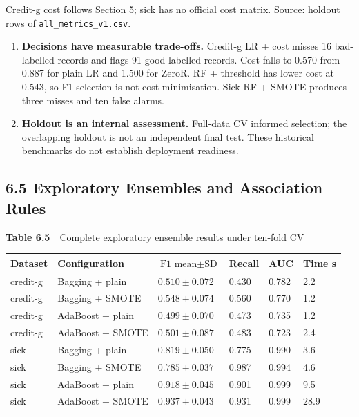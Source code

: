 \documentclass[12pt]{article}
\begin{document}
Credit-g cost follows Section 5; sick has no official cost matrix.
Source: holdout rows of \texttt{all\_metrics\_v1.csv}.

\begin{enumerate}
\item \textbf{Decisions have measurable trade-offs.} Credit-g LR + cost misses 16
bad-labelled records and flags 91 good-labelled records. Cost falls to 0.570 from
0.887 for plain LR and 1.500 for ZeroR. RF + threshold has lower cost at 0.543, so F1
selection is not cost minimisation. Sick RF + SMOTE produces three misses and ten
false alarms.
\item \textbf{Holdout is an internal assessment.} Full-data CV informed selection; the
overlapping holdout is not an independent final test. These historical benchmarks do
not establish deployment readiness.
\end{enumerate}

\subsection*{6.5 Exploratory Ensembles and Association Rules}

\begin{center}
\begin{minipage}{\textwidth}
\centering
{\footnotesize\textbf{Table 6.5}\ \ Complete exploratory ensemble results under ten-fold CV}

\footnotesize
\begin{tabular}{p{0.75in}p{1.3in}p{1.05in}p{0.65in}p{0.55in}p{0.55in}}
\toprule
Dataset & Configuration & $\text{F1 mean} \pm \text{SD}$ & Recall & AUC & Time s \\
\midrule
credit-g & Bagging + plain & $0.510 \pm 0.072$ & 0.430 & 0.782 & 2.2 \\
credit-g & Bagging + SMOTE & $\mathbf{0.548 \pm 0.074}$ & 0.560 & 0.770 & 1.2 \\
credit-g & AdaBoost + plain & $0.499 \pm 0.070$ & 0.473 & 0.735 & 1.2 \\
credit-g & AdaBoost + SMOTE & $0.501 \pm 0.087$ & 0.483 & 0.723 & 2.4 \\
sick & Bagging + plain & $0.819 \pm 0.050$ & 0.775 & 0.990 & 3.6 \\
sick & Bagging + SMOTE & $0.785 \pm 0.037$ & 0.987 & 0.994 & 4.6 \\
sick & AdaBoost + plain & $0.918 \pm 0.045$ & 0.901 & 0.999 & 9.5 \\
sick & AdaBoost + SMOTE & $\mathbf{0.937 \pm 0.043}$ & 0.931 & 0.999 & 28.9 \\
\bottomrule
\end{tabular}
\end{minipage}
\end{center}
\end{document}
